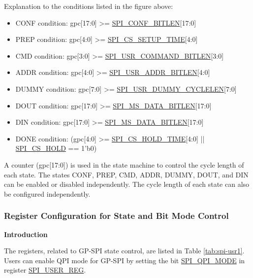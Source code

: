 \documentclass[main\_\_EN.tex]{subfiles}
\begin{document}
Explanation to the conditions listed in the figure above:
\begin{itemize}
    \item CONF condition: gpc[17:0] >= \hyperref[fielddesc:SPICONFBITLEN]{SPI\_CONF\_BITLEN}[17:0]
    \item PREP condition: gpc[4:0] >= \hyperref[fielddesc:SPICSSETUPTIME]{SPI\_CS\_SETUP\_TIME}[4:0]
    \item CMD condition: gpc[3:0] >= \hyperref[fielddesc:SPIUSRCOMMANDBITLEN]{SPI\_USR\_COMMAND\_BITLEN}[3:0]
    \item ADDR condition: gpc[4:0] >= \hyperref[fielddesc:SPIUSRADDRBITLEN]{SPI\_USR\_ADDR\_BITLEN}[4:0]
    \item DUMMY condition: gpc[7:0] >= \hyperref[fielddesc:SPIUSRDUMMYCYCLELEN]{SPI\_USR\_DUMMY\_CYCLELEN}[7:0]
    \item DOUT condition: gpc[17:0] >= \hyperref[fielddesc:SPIMSDATABITLEN]{SPI\_MS\_DATA\_BITLEN}[17:0]
    \item DIN condition: gpc[17:0] >= \hyperref[fielddesc:SPIMSDATABITLEN]{SPI\_MS\_DATA\_BITLEN}[17:0]

    \item DONE condition: (gpc[4:0] >= \hyperref[fielddesc:SPICSHOLDTIME]{SPI\_CS\_HOLD\_TIME}[4:0] || \hyperref[fielddesc:SPICSHOLD]{SPI\_CS\_HOLD} == 1'b0)

\end{itemize}

A counter (gpc[17:0]) is used in the state machine to control the cycle length of each state. The states CONF, PREP, CMD, ADDR, DUMMY, DOUT, and DIN can be enabled or disabled independently. The cycle length of each state can also be configured independently.

\subsubsection{Register Configuration for State and Bit Mode Control} \label{sec:gp-spi2-state-and-register-configuration}

\textbf{Introduction}

The registers, related to GP-SPI state control, are listed in Table \ref{tab:spi-usr1}. Users can enable QPI mode for GP-SPI by setting the bit \hyperref[fielddesc:SPIQPIMODE]{SPI\_QPI\_MODE} in register \hyperref[regdesc:SPIUSERREG]{SPI\_USER\_REG}.
\end{document}
